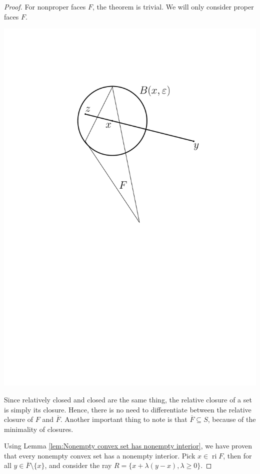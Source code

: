 \begin{proof}
  For nonproper faces \( F \), the theorem is trivial. We will only consider
  proper faces \( F \).

  \centerline{
    \includegraphics[scale=0.5]{figures/1696828548}
  }

  Since relatively closed and closed are the same thing, the relative closure of
  a set is simply its closure. Hence, there is no need to differentiate between
  the relative closure of \( F \) and \( \overline{F} \). Another important
  thing to note is that \( \overline{F} \subseteq S \), because of the
  minimality of closures.

  Using Lemma \ref{lem:Nonempty convex set has nonempty interior}, we have proven
  that every nonempty convex set has a nonempty interior. Pick \( x \in
  \operatorname{ri} F \), then for all \( y \in \overline{F}
  \setminus \{ x\}   \), and consider the ray \( R = \{x + \lambda (y - x),
  \lambda \ge  0\}   \).


\end{proof}
